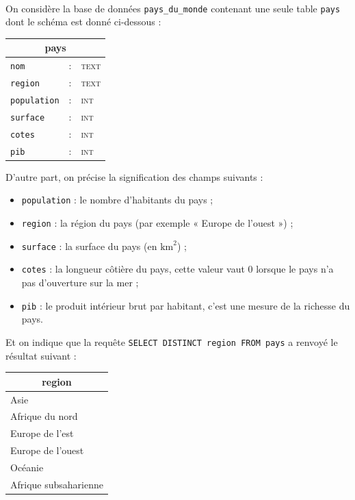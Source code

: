 \documentclass[11pt,a4paper]{article}
\begin{document}
\begin{Exercise}[title={Requêtes \textsc{sql} sur une seule table}]\\
	On considère la base de données {\tt pays\_du\_monde} contenant une seule table {\tt pays} dont le schéma est donné ci-dessous :
	\begin{center}
	\begin{tabular}{|lll|}
		\hline
		\multicolumn{3}{|c|}{\textbf{pays}} \\
		\hline
		{\tt nom} & : & \textsc{text} \\
		\hline
		{\tt region} & : & \textsc{text} \\
		\hline
		{\tt population} & : & \textsc{int} \\
		\hline
		{\tt surface} & : & \textsc{int} \\
		\hline
		{\tt cotes} & : & \textsc{int} \\
		\hline
		{\tt pib} & : & \textsc{int} \\
		\hline
		\end{tabular}
	\end{center}
	D'autre part, on précise la signification des champs suivants : 
	\begin{itemize}
		\item {\tt population} : le nombre d'habitants du pays ;
		\item {\tt region} : la région du pays (par exemple « Europe de l'ouest ») ;
		\item {\tt surface} : la surface du pays (en $\text{km}^2$) ;
		\item {\tt cotes} : la longueur côtière du pays, cette valeur vaut 0 lorsque le pays n'a pas d'ouverture sur la mer ;
		\item {\tt pib} : le produit intérieur brut par habitant, c'est une mesure de la richesse du pays.
		\end{itemize}
	Et on indique que la requête \texttt{SELECT DISTINCT region FROM pays} a renvoyé le résultat suivant : 
	\begin{center}
	\begin{tabular}{|l|}
		\hline
		\multicolumn{1}{|c|}{\textbf{region}} \\
		\hline
		Asie \\
		Afrique du nord \\
		Europe de l'est \\
		Europe de l'ouest \\
		Océanie \\
		Afrique subsaharienne \\

\end{tabular}
\end{center}
\end{Exercise}
\end{document}
